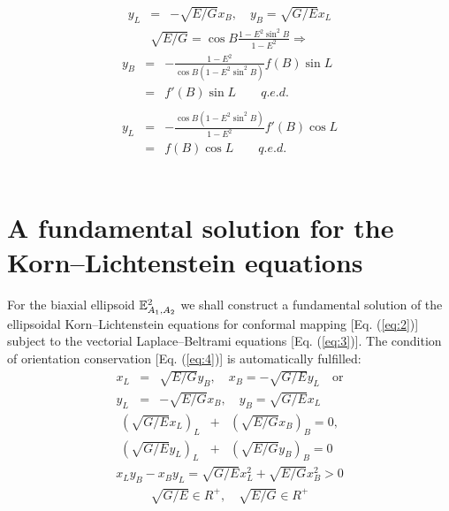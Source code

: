 \documentclass[jog]{svjour}
\begin{document}
\begin{example}
\begin{eqnarray*}
y_L &= &-\sqrt{E/G}x_B, \quad y_B=\sqrt{G/E}x_L
\end{eqnarray*}
\begin{eqnarray*}
\sqrt{E/G}=\cos B\frac{1-E^2\sin^2B}{1-E^2} \Longrightarrow
\end{eqnarray*}
\begin{eqnarray*}
y_B &= &-\frac{1-E^2}{\cos B(1-E^2\sin^2B)}f(B)\sin L \\
 &= &f'(B)\sin L\quad\quad q.e.d.\\
 &&\\
y_L &= &-\frac{\cos B(1-E^2\sin^2B)}{1-E^2}f'(B)\cos L \\
 &= &f(B)\cos L\quad\quad q.e.d.
\end{eqnarray*}\\
\end{example}



\section{A fundamental solution for the Korn--Lichtenstein equations}
\label{sec:3}

For the biaxial ellipsoid $\Bbb{E}^2_{A_1,A_2}$ we shall construct a
fundamental solution of the ellipsoidal Korn--Lichtenstein equations for
conformal mapping [Eq. (\ref{eq:2})] subject to the vectorial
Laplace--Beltrami equations [Eq. (\ref{eq:3})]. The condition of
orientation conservation [Eq. (\ref{eq:4})] is automatically fulfilled:
\setcounter{equation}{0}%
\renewcommand{\theequation}{5\alph{equation}}%
\begin{eqnarray}
x_L &= &\sqrt{E/G}y_B, \quad x_B=-\sqrt{G/E}y_L \quad \mbox{or}
\nonumber \\
y_L &= &-\sqrt{E/G}x_B, \quad y_B=\sqrt{G/E}x_L
\label{eq:5a}
\end{eqnarray}
\begin{eqnarray}
(\sqrt{G/E}x_L)_L &+ &(\sqrt{E/G}x_B)_B=0,
\nonumber \\
(\sqrt{G/E}y_L)_L &+ &(\sqrt{E/G}y_B)_B=0
\label{eq:5b}
\end{eqnarray}
\begin{eqnarray}
x_Ly_B-x_By_L=\sqrt{G/E}x^2_L+\sqrt{E/G}x^2_B > 0
\label{eq:5c}
\end{eqnarray}
\begin{eqnarray}
\sqrt{G/E}\in R^+, \quad
\sqrt{E/G}\in R^+
\label{eq:5d}
\end{eqnarray}
\renewcommand{\theequation}{\thesection.\arabic{equation}}
\end{document}
